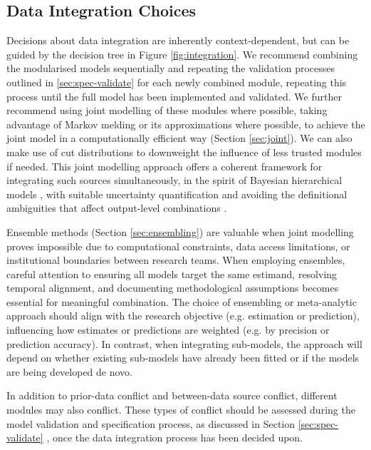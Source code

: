 \documentclass{article}
\begin{document}
\subsection{Data Integration Choices}\label{sec:integration}

Decisions about data integration are inherently context-dependent, but can be guided by the decision tree in Figure \ref{fig:integration}. We recommend combining the modularised models sequentially and repeating the validation processes outlined in \ref{sec:spec-validate} for each newly combined module, repeating this process until the full model has been implemented and validated.
We further recommend using joint modelling of these modules where possible, taking advantage of Markov melding \citep{goudie2019joining} or its approximations where possible, to achieve the joint model in a computationally efficient way (Section \ref{sec:joint}). We can also make use of cut distributions \citep{plummer2015cuts} to downweight the influence of less trusted modules if needed. 
This joint modelling approach offers a coherent framework for integrating such sources simultaneously, in the spirit of Bayesian hierarchical models \citep{gelman2020bayesian,deangelis2018analysing}, with suitable uncertainty quantification and avoiding the definitional ambiguities that affect output-level combinations \citep{manley2024combining, brockhaus2023why}. 

Ensemble methods (Section \ref{sec:ensembling}) are valuable when joint modelling proves impossible due to computational constraints, data access limitations, or institutional boundaries between research teams.
When employing ensembles, careful attention to ensuring all models target the same estimand, resolving temporal alignment, and documenting methodological assumptions becomes essential for meaningful combination. The choice of ensembling or meta-analytic approach should align with the research objective (e.g. estimation or prediction), influencing how estimates or predictions are weighted (e.g. by precision or prediction accuracy). In contrast, when integrating sub-models, the approach will depend on whether existing sub-models have already been fitted or if the models are being developed de novo.

In addition to prior-data conflict and between-data source conflict, different modules may also conflict. These types of conflict should be assessed during the model validation and specification process, as discussed in Section \ref{sec:spec-validate} \citep{presanis2013conflict,sherratt2021exploring,yang2025detecting}, once the data integration process has been decided upon.
\end{document}
